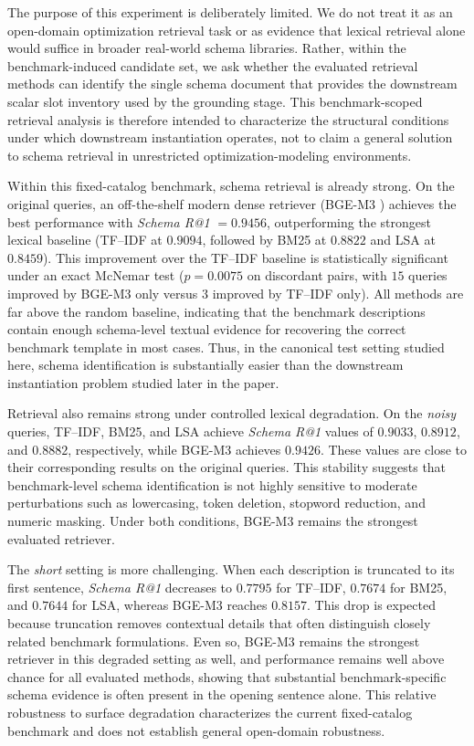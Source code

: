 \documentclass[pdflatex,sn-basic,Numbered]{sn-jnl}
\begin{document}
The purpose of this experiment is deliberately limited. We do not treat it as an open-domain optimization retrieval task or as evidence that lexical retrieval alone would suffice in broader real-world schema libraries. Rather, within the benchmark-induced candidate set, we ask whether the evaluated retrieval methods can identify the single schema document that provides the downstream scalar slot inventory used by the grounding stage. This benchmark-scoped retrieval analysis is therefore intended to characterize the structural conditions under which downstream instantiation operates, not to claim a general solution to schema retrieval in unrestricted optimization-modeling environments.

Within this fixed-catalog benchmark, schema retrieval is already strong. On the original queries, an off-the-shelf modern dense retriever (BGE-M3 \cite{chen2024m3embedding}) achieves the best performance with \textit{Schema R@1} $= 0.9456$, outperforming the strongest lexical baseline (TF--IDF at $0.9094$, followed by BM25 at $0.8822$ and LSA at $0.8459$). This improvement over the TF--IDF baseline is statistically significant under an exact McNemar test ($p=0.0075$ on discordant pairs, with $15$ queries improved by BGE-M3 only versus $3$ improved by TF--IDF only). All methods are far above the random baseline, indicating that the benchmark descriptions contain enough schema-level textual evidence for recovering the correct benchmark template in most cases. Thus, in the canonical test setting studied here, schema identification is substantially easier than the downstream instantiation problem studied later in the paper.

Retrieval also remains strong under controlled lexical degradation. On the \emph{noisy} queries, TF--IDF, BM25, and LSA achieve \textit{Schema R@1} values of $0.9033$, $0.8912$, and $0.8882$, respectively, while BGE-M3 achieves $0.9426$. These values are close to their corresponding results on the original queries. This stability suggests that benchmark-level schema identification is not highly sensitive to moderate perturbations such as lowercasing, token deletion, stopword reduction, and numeric masking. Under both conditions, BGE-M3 remains the strongest evaluated retriever.

The \emph{short} setting is more challenging. When each description is truncated to its first sentence, \textit{Schema R@1} decreases to $0.7795$ for TF--IDF, $0.7674$ for BM25, and $0.7644$ for LSA, whereas BGE-M3 reaches $0.8157$. This drop is expected because truncation removes contextual details that often distinguish closely related benchmark formulations. Even so, BGE-M3 remains the strongest retriever in this degraded setting as well, and performance remains well above chance for all evaluated methods, showing that substantial benchmark-specific schema evidence is often present in the opening sentence alone. This relative robustness to surface degradation characterizes the current fixed-catalog benchmark and does not establish general open-domain robustness.
\end{document}
